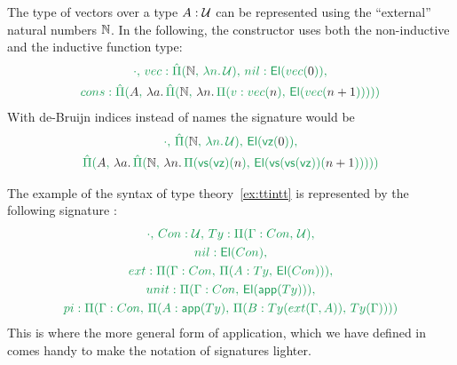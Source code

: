 \begin{example}[Vectors]\label{ex:ii-syntax-vec}
The type of vectors over a type $A : \mathcal{U}$ can be represented using the ``external''
natural numbers $\mathbb{N}$.
In the following, the constructor  uses both the non-inductive
and the inductive function type:
\begin{equation*}
\begin{gathered}
\grm{ \cdot,\, \mathop{vec} : \ExtPi{\N}{\lambda n.\, \UU},\, \mathop{nil} : \El(\mathop{vec}(\blm{0})),} \\
\grm{ \mathop{cons} : \ExtPi{A}{\blm{\lambda a.\,
  \grm{\ExtPi{\N}{\blm{\lambda n.\, \grm{\Pi(v : \mathop{vec}(\blm{n}),\, \El(\mathop{vec}(\blm{n + 1})))}}}}}}}
\end{gathered}
\end{equation*}
With de-Bruijn indices instead of names the signature  would be
\begin{equation*}
\begin{gathered}
\grm{ \cdot,\, \ExtPi{\N}{\lambda n.\, \UU},\, \El(\vz(\blm{0})),} \\
\grm{ \ExtPi{A}{\blm{\lambda a.\,
  \grm{\ExtPi{\N}{\blm{\lambda n.\, \grm{\Pi(\vs(\vz)(\blm{n}),\, \El(\vs(\vs(\vz))(\blm{n + 1})))}}}}}}}
\end{gathered}
\end{equation*}
\end{example}

\begin{example}
The example of the syntax of type theory~\ref{ex:ttintt} is represented by the
following signature :
\begin{equation*}
\begin{gathered}
\grm{\cdot,\, \mathop{Con} : \UU,\, \mathop{Ty} : \Pi(\Gamma : \mathop{Con},\, \UU),} \\
\grm{\mathop{nil} : \El(\mathop{Con}),} \\
\grm{\mathop{ext} : \Pi(\Gamma : \mathop{Con},\, \Pi(A : \mathop{Ty} ,\, \El(\mathop{Con}))),} \\
\grm{\mathop{unit} : \Pi(\Gamma : \mathop{Con},\, \El(\IIapp(\mathop{Ty}))),} \\
\grm{\mathop{pi} : \Pi(\Gamma : \mathop{Con},\, \Pi(A : \IIapp(\mathop{Ty}),\,
   \Pi(B : \mathop{Ty}(\mathop{ext}(\Gamma,A)),\, \mathop{Ty}(\Gamma))))}
\end{gathered}
\end{equation*}
This is where the more general form of application, which we have defined in
 comes handy to make the notation of signatures lighter.
\end{example}

